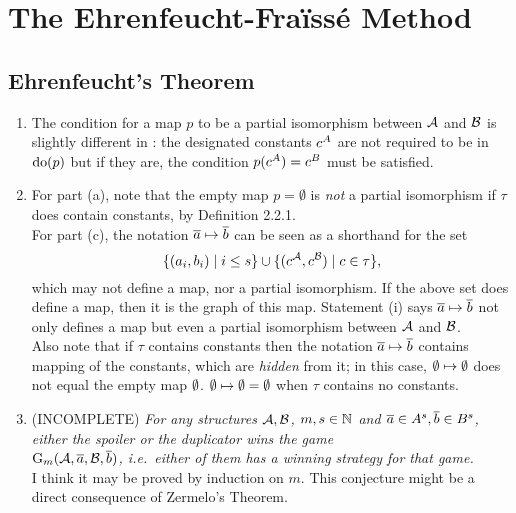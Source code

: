 \chapter{The Ehrenfeucht-Fra\"{i}ss\'{e} Method}
\setcounter{section}{1}
\section{Ehrenfeucht's Theorem}
\begin{enumerate}[1.]
%
\item {} The condition for a map $p$ to be a partial isomorphism between $\mathcal{A}$ and $\mathcal{B}$ is slightly different in \cite{EFT}: the designated constants $c^{A}$ are not required to be in ${\mathrm{do}({p})}$ but if they are, the condition $p(c^{A}) = c^{B}$ must be satisfied.
%
\item {} For part (a), note that the empty map $p = \emptyset$ is \emph{not} a partial isomorphism if $\tau$ does contain constants, by Definition 2.2.1.
\medskip\\
For part (c), the notation $\overline{a} \mapsto \overline{b}$ can be seen as a shorthand for the set
\[
{\{(a_i, b_i) \mid i \leq s\}} \cup {\{(c^{\mathcal{A}}, c^{\mathcal{B}}) \mid c \in \tau\}},\]
which may not define a map, nor a partial isomorphism. If the above set does define a map, then it is the graph of this map. Statement (i) says $\overline{a} \mapsto \overline{b}$ not only defines a map but even a partial isomorphism between $\mathcal{A}$ and $\mathcal{B}$.
\medskip\\
Also note that if $\tau$ contains constants then the notation $\overline{a} \mapsto \overline{b}$ contains mapping of the constants, which are \emph{hidden} from it; in this case, $\emptyset \mapsto \emptyset$ does not equal the empty map $\emptyset$. $\emptyset \mapsto \emptyset = \emptyset$ when $\tau$ contains no constants.
%
\item {} (INCOMPLETE) \emph{For any structures $\mathcal{A}, \mathcal{B}$, $m, s \in \mathbb{N}$ and $\overline{a} \in A^{s}, \overline{b} \in B^{s}$, either the spoiler or the duplicator wins the game\\$\game{m}{\strct{A}, \vect{a}, \strct{B}, \vect{b}}$, i.e.\ either of them has a winning strategy for that game.}
\medskip\\
I think it may be proved by induction on $m$. This conjecture might be a direct consequence of Zermelo's Theorem.

\end{enumerate}
